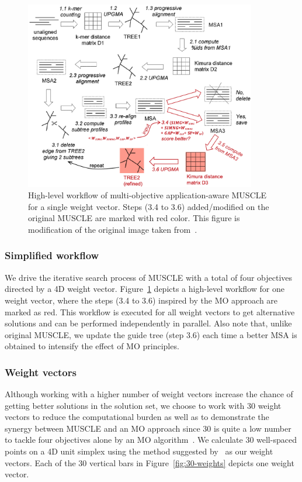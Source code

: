 \begin{figure}[!htbp]
	\centering
	\includegraphics[width=0.9\textwidth]{Figure/ma-muscle}
	\caption{High-level workflow of multi-objective application-aware MUSCLE for a single weight vector. Steps (3.4 to 3.6) added/modified on the original MUSCLE are marked with red color. This figure is modification of the original image taken from~\cite{edgar2004muscle}.}
	\label{fig:ma-muscle}
\end{figure}

\subsubsection{Simplified workflow}
We drive the iterative search process of MUSCLE with a total of four objectives directed by a 4D weight vector. Figure~\ref{fig:ma-muscle} depicts a high-level workflow for one weight vector, where the steps (3.4 to 3.6) inspired by the MO approach are marked as red. This workflow is executed for all weight vectors to get alternative solutions and can be performed independently in parallel. %
Also note that, unlike original MUSCLE, we update the guide tree (step 3.6) each time a better MSA is obtained to intensify the effect of MO principles.

\subsubsection{Weight vectors}
Although working with a higher number of weight vectors increase the chance of getting better solutions in the solution set, we choose to work with 30 weight vectors to reduce the computational burden as well as to demonstrate the synergy between MUSCLE and an MO approach since 30 is quite a low number to tackle four objectives alone by an MO algorithm~\cite{deb2014evolutionary}. We calculate 30 well-spaced points on a 4D unit simplex using the method suggested by~\cite{ref_dirs_energy} as our weight vectors. Each of the 30 vertical bars in Figure~\ref{fig:30-weights} depicts one weight vector. %


